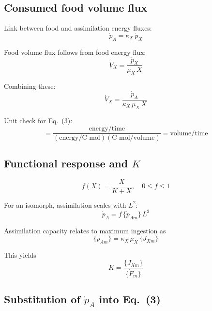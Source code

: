\documentclass[11pt]{article}
\begin{document}
\subsection*{Consumed food volume flux}

Link between food and assimilation energy fluxes:
\begin{equation}
  \dot{p}_A = \kappa_X\,\dot{p}_X\tag{1}
\end{equation}

Food volume flux follows from food energy flux:
\begin{equation}
  \dot{V}_X = \frac{\dot{p}_X}{\mu_X\,X}\tag{2}
\end{equation}

Combining these:
\begin{equation}
  \dot{V}_X = \frac{\dot{p}_A}{\kappa_X\,\mu_X\,X}\tag{3}
\end{equation}

Unit check for Eq.~(3):
\begin{equation*}
  [\dot{V}_X] = \frac{\text{energy}/\text{time}}{(\text{energy}/\text{C-mol})(\text{C-mol}/\text{volume})} = \text{volume}/\text{time}
\end{equation*}

\subsection*{Functional response and $K$}

\begin{equation}
  f(X) = \frac{X}{K + X}, \quad 0 \le f \le 1\tag{4}
\end{equation}

For an isomorph, assimilation scales with $L^2$:
\begin{equation}
  \dot{p}_A = f\,\{\dot{p}_{Am}\}\,L^2\tag{5}
\end{equation}

Assimilation capacity relates to maximum ingestion as
\begin{equation}
  \{\dot{p}_{Am}\} = \kappa_X\,\mu_X\,\{J_{Xm}\}\tag{6}
\end{equation}

This yields
\begin{equation}
  K = \frac{\{J_{Xm}\}}{\{\dot{F}_m\}}\tag{7}
\end{equation}

\subsection*{Substitution of $\dot p_A$ into Eq.~(3)}
\end{document}
